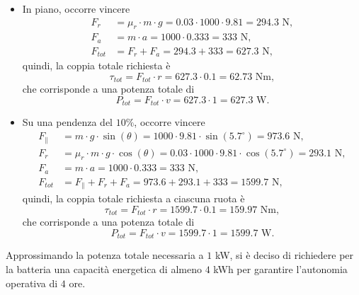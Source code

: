 \begin{itemize}
    \item In piano, occorre vincere
          \begin{equation}
              \begin{aligned}
                  F_{r}   & = \mu_r \cdot m \cdot g = 0.03 \cdot 1000 \cdot 9.81 = 294.3 \text{ N}, \\
                  F_{a}   & = m \cdot a = 1000 \cdot 0.333 = 333 \text{ N},                         \\
                  F_{tot} & = F_{r} + F_{a} = 294.3 + 333 = 627.3 \text{ N},
              \end{aligned}
          \end{equation}
          quindi, la coppia totale richiesta è
          \begin{equation}
              \tau_{tot} = F_{tot} \cdot r = 627.3 \cdot 0.1 = 62.73 \text{ Nm},
          \end{equation}
          che corrisponde a una potenza totale di
          \begin{equation}
              P_{tot} = F_{tot} \cdot v = 627.3 \cdot 1 = 627.3 \text{ W}.
          \end{equation}
    \item Su una pendenza del $10\%$, occorre vincere
          \begin{equation}
              \begin{aligned}
                  F_{\parallel} & = m \cdot g \cdot \sin(\theta) = 1000 \cdot 9.81 \cdot \sin(5.7^\circ) = 973.6 \text{ N},                        \\
                  F_{r}         & = \mu_r \cdot m \cdot g \cdot \cos(\theta) = 0.03 \cdot 1000 \cdot 9.81 \cdot \cos(5.7^\circ) = 293.1 \text{ N}, \\
                  F_{a}         & = m \cdot a = 1000 \cdot 0.333 = 333 \text{ N},                                                                  \\
                  F_{tot}       & = F_{\parallel} + F_{r} + F_{a} = 973.6 + 293.1 + 333 = 1599.7 \text{ N},
              \end{aligned}
          \end{equation}
          quindi, la coppia totale richiesta a ciascuna ruota è
          \begin{equation}
              \tau_{tot} = F_{tot} \cdot r = 1599.7 \cdot 0.1 = 159.97 \text{ Nm},
          \end{equation}
          che corrisponde a una potenza totale di
          \begin{equation}
              P_{tot} = F_{tot} \cdot v = 1599.7 \cdot 1 = 1599.7 \text{ W}.
          \end{equation}
\end{itemize}
Approssimando la potenza totale necessaria a $1$ kW, si è deciso di richiedere per la batteria una capacità energetica di almeno $4$ kWh per garantire l'autonomia operativa di $4$ ore.

